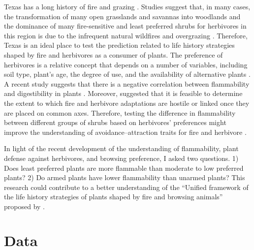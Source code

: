 \documentclass[12pt]{report}
\begin{document}
Texas has a long history of fire \citep{moir1982firehistory, stambaugh2011firehistory,stambaugh2014historicalfirehistory,smeins2005historyoffire1} and grazing \citep{buechner1950lifegrazing, wilcox2012historicalgrazing2}. Studies suggest that, in many cases, the transformation of many open grasslands and savannas into woodlands and the dominance of many fire-sensitive and least preferred shrubs for herbivores in this region is due to the infrequent natural wildfires and overgrazing \citep{archer1989havejoint,andruk2014joint, masters1986prescribed}. Therefore, Texas is an ideal place to test the prediction related to life history strategies shaped by fire and herbivores as a consumer of plants. The preference of herbivores is a relative concept that depends on a number of variables, including soil type, plant's age, the degree of use, and the availability of alternative plants \citep{wright2003white}.  A recent study suggests that there is a negative correlation between flammability and digestibility in plants \citep{gowda2022digestibility}. Moreover, \citep{archibald2019unified} suggested that it is feasible to determine the extent to which fire and herbivore adaptations are hostile or linked once they are placed on common axes. Therefore, testing the difference in flammability between different groups of shrubs based on herbivores' preferences might improve the understanding of avoidance–attraction traits for fire and herbivore \citep{schwilk2003flammability, archibald2019unified}. 

In light of the recent development of the understanding of flammability, plant defense against herbivores, and browsing preference, I asked two questions. 1) Does least preferred plants are more flammable than moderate to low preferred plants?  2) Do armed plants have lower flammability than unarmed plants? This research could contribute to a better understanding of the ``Unified framework of the life history strategies of plants shaped by fire and browsing animals'' proposed by \citep{archibald2019unified}.


\section{Data}
\end{document}
